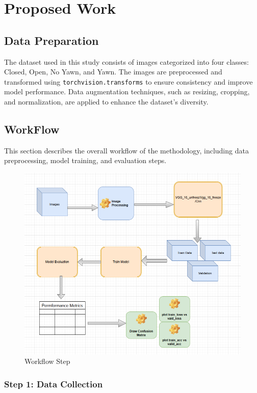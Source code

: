 \chapter{Proposed Work}

\section{Data Preparation}

The dataset used in this study consists of images categorized into four classes: Closed, Open, No Yawn, and Yawn. The images are preprocessed and transformed using \texttt{torchvision.transforms} to ensure consistency and improve model performance. Data augmentation techniques, such as resizing, cropping, and normalization, are applied to enhance the dataset's diversity.

\section{WorkFlow}

This section describes the overall workflow of the methodology, including data preprocessing, model training, and evaluation steps.

\begin{figure}[H]
  \centering
  \includegraphics[width=1\linewidth]{common_workflow.png}
  \caption{Workflow Step}
  \label{fig:workflow1}
\end{figure}

\subsection{Step 1: Data Collection}

